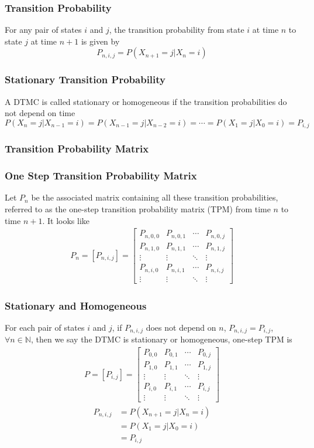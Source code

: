 \documentclass[11pt]{article}
\newcommand{\N}{{\mathbb{N}}}
\begin{document}
\subsubsection{Transition Probability}
For any pair of states $i$ and $j$, the transition probability from state $i$ at time $n$ to state $j$ at time $n+1$ is given by 
\[P_{n,i,j}=P(X_{n+1}=j|X_n=i)\]    
\subsubsection{Stationary Transition Probability}
A DTMC is called stationary or homogeneous if the transition probabilities do not depend on time 
\[P(X_n=j|X_{n-1} = i) = P(X_{n-1}=j|X_{n-2} = i) = \cdots = P(X_1=j|X_0=i) = P_{i,j}\]
\subsubsection{Transition Probability Matrix}
\subsubsection*{One Step Transition Probability Matrix}
Let $P_n$ be the associated matrix containing all these transition probabilities, referred to as the one-step transition probability matrix (TPM) from time $n$ to time $n+1$. It looks like 
\begin{align*}
    P_n = [P_{n,i,j}] = 
    \begin{bmatrix}
        P_{n,0,0} & P_{n,0,1} & \cdots & P_{n,0,j} \\
        P_{n,1,0} & P_{n,1,1} & \cdots & P_{n,1,j} \\
        \vdots & \vdots & \ddots & \vdots \\
        P_{n,i,0} & P_{n,i,1} & \cdots & P_{n,i,j} \\
        \vdots & \vdots & \ddots & \vdots 
    \end{bmatrix}
\end{align*}
\subsubsection*{Stationary and Homogeneous}
For each pair of states $i$ and $j$, if $P_{n,i,j}$ does not depend on $n$, $P_{n,i,j}=P_{i,j}$, $\forall n\in\N$, then we say the DTMC is stationary or homogeneous, one-step TPM is 
\begin{align*}
    P = [P_{i,j}] =
    \begin{bmatrix}
        P_{0,0} & P_{0,1} & \cdots & P_{0,j} \\
        P_{1,0} & P_{1,1} & \cdots & P_{1,j} \\
        \vdots & \vdots & \ddots & \vdots \\
        P_{i,0} & P_{i,1} & \cdots & P_{i,j} \\
        \vdots & \vdots & \ddots & \vdots
    \end{bmatrix}
\end{align*}
\begin{align*}
    P_{n,i,j}&=P(X_{n+1}=j|X_n=i)\\
    &= P(X_1=j|X_0=i) \\
    &= P_{i,j} 
\end{align*}
\end{document}
